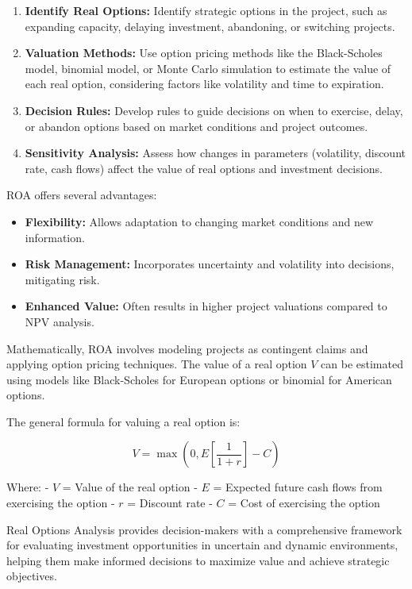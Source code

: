 \documentclass[12pt]{book} %
\begin{document}
\begin{enumerate}
    \item \textbf{Identify Real Options:} Identify strategic options in the project, such as expanding capacity, delaying investment, abandoning, or switching projects.
    \item \textbf{Valuation Methods:} Use option pricing methods like the Black-Scholes model, binomial model, or Monte Carlo simulation to estimate the value of each real option, considering factors like volatility and time to expiration.
    \item \textbf{Decision Rules:} Develop rules to guide decisions on when to exercise, delay, or abandon options based on market conditions and project outcomes.
    \item \textbf{Sensitivity Analysis:} Assess how changes in parameters (volatility, discount rate, cash flows) affect the value of real options and investment decisions.
\end{enumerate}

ROA offers several advantages:

\begin{itemize}
    \item \textbf{Flexibility:} Allows adaptation to changing market conditions and new information.
    \item \textbf{Risk Management:} Incorporates uncertainty and volatility into decisions, mitigating risk.
    \item \textbf{Enhanced Value:} Often results in higher project valuations compared to NPV analysis.
\end{itemize}

Mathematically, ROA involves modeling projects as contingent claims and applying option pricing techniques. The value of a real option \(V\) can be estimated using models like Black-Scholes for European options or binomial for American options.

The general formula for valuing a real option is:

\[ V = \max \left(0, E \left[ \frac{1}{1 + r} \right] - C \right) \]

Where:
- \( V \) = Value of the real option
- \( E \) = Expected future cash flows from exercising the option
- \( r \) = Discount rate
- \( C \) = Cost of exercising the option

Real Options Analysis provides decision-makers with a comprehensive framework for evaluating investment opportunities in uncertain and dynamic environments, helping them make informed decisions to maximize value and achieve strategic objectives.
\end{document}
